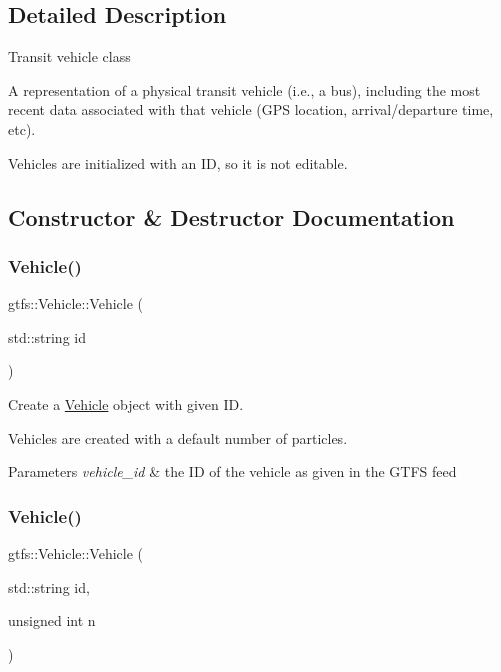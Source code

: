 \subsection{Detailed Description}
Transit vehicle class

A representation of a physical transit vehicle (i.\+e., a bus), including the most recent data associated with that vehicle (G\+PS location, arrival/departure time, etc).

Vehicles are initialized with an ID, so it is not editable. 

\subsection{Constructor \& Destructor Documentation}
\mbox{\label{classgtfs_1_1Vehicle_ac3f8111a611378f5f8b29f7465e48919}} 
\subsubsection{\texorpdfstring{Vehicle()}{Vehicle()}\hspace{0.1cm}{\footnotesize\ttfamily [1/2]}}
{\footnotesize\ttfamily gtfs\+::\+Vehicle\+::\+Vehicle (\begin{DoxyParamCaption}\item[{std\+::string}]{id }\end{DoxyParamCaption})}

Create a \hyperlink{classgtfs_1_1Vehicle}{Vehicle} object with given ID.

Vehicles are created with a default number of particles.


\begin{DoxyParams}{Parameters}
{\em vehicle\+\_\+id} & the ID of the vehicle as given in the G\+T\+FS feed \\
\hline
\end{DoxyParams}
\mbox{\label{classgtfs_1_1Vehicle_adf892e71483b7f9005846599fd0308e6}} 
\subsubsection{\texorpdfstring{Vehicle()}{Vehicle()}\hspace{0.1cm}{\footnotesize\ttfamily [2/2]}}
{\footnotesize\ttfamily gtfs\+::\+Vehicle\+::\+Vehicle (\begin{DoxyParamCaption}\item[{std\+::string}]{id,  }\item[{unsigned int}]{n }\end{DoxyParamCaption})}

